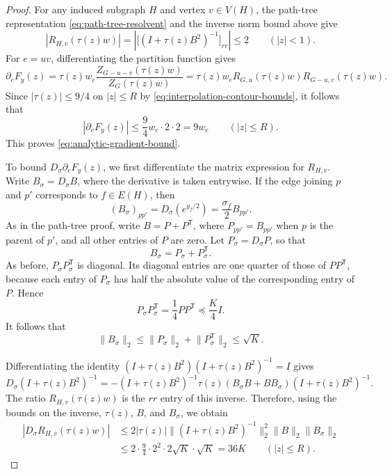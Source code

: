 \documentclass[11pt,reqno,letterpaper]{amsart}
\numberwithin{equation}{section}
\theoremstyle{definition}
\theoremstyle{remark}
\newcommand{\norm}[1]{\lVert #1\rVert}
\begin{document}
\begin{proof}
For any induced subgraph $H$ and vertex $v\in V(H)$, the path-tree
representation \cref{eq:path-tree-resolvent} and the inverse norm bound
above give
\begin{equation*}
 |R_{H,v}(\tau(z)w)|
 =\left|\bigl[(I+\tau(z)B^2)^{-1}\bigr]_{rr}\right|
 \le2
 \qquad(|z|<1).
\end{equation*}
For $e=uv$, differentiating the partition function gives
\[
 \partial_eF_y(z)
 =\tau(z)w_e\frac{Z_{G-u-v}(\tau(z)w)}{Z_G(\tau(z)w)}
 =\tau(z)w_eR_{G,u}(\tau(z)w)R_{G-u,v}(\tau(z)w).
\]
Since $|\tau(z)|\le9/4$ on $|z|\le R$ by
\cref{eq:interpolation-contour-bounds}, it follows that
\[
 |\partial_eF_y(z)|
 \le\frac94w_e\cdot2\cdot2=9w_e
 \qquad(|z|\le R).
\]
This proves \cref{eq:analytic-gradient-bound}.

To bound $D_\sigma\partial_eF_y(z)$, we first differentiate the
matrix expression for $R_{H,v}$. Write $B_\sigma=D_\sigma B$,
where the derivative is taken entrywise. If the edge joining
$p$ and $p'$ corresponds to $f\in E(H)$, then
\[
 (B_\sigma)_{pp'}
 =D_\sigma(e^{y_f/2})
 =\frac{\sigma_f}{2}B_{pp'}.
\]
As in the path-tree proof, write $B=P+P^{\mathsf T}$, where
$P_{pp'}=B_{pp'}$ when $p$ is the parent of $p'$, and all other
entries of $P$ are zero. Let $P_\sigma=D_\sigma P$, so that
\[
 B_\sigma=P_\sigma+P_\sigma^{\mathsf T}.
\]
As before, $P_\sigma P_\sigma^{\mathsf T}$ is diagonal.
Its diagonal entries are one quarter of those of
$PP^{\mathsf T}$, because each entry of $P_\sigma$ has half
the absolute value of the corresponding entry of $P$. Hence
\[
 P_\sigma P_\sigma^{\mathsf T}
 =\frac14PP^{\mathsf T}\preceq\frac K4I.
\]
It follows that
\begin{equation*}
 \norm{B_\sigma}_2
 \le\norm{P_\sigma}_2+\norm{P_\sigma^{\mathsf T}}_2
 \le\sqrt K.
\end{equation*}

Differentiating the identity
$(I+\tau(z)B^2)(I+\tau(z)B^2)^{-1}=I$ gives
\[
 D_\sigma(I+\tau(z)B^2)^{-1}
 =-(I+\tau(z)B^2)^{-1}
   \tau(z)(B_\sigma B+BB_\sigma)
   (I+\tau(z)B^2)^{-1}.
\]
The ratio $R_{H,v}(\tau(z)w)$ is the $rr$ entry of this inverse.
Therefore, using the bounds on the inverse, $\tau(z)$, $B$,
and $B_\sigma$, we obtain
\begin{align*}
 |D_\sigma R_{H,v}(\tau(z)w)|
 &\le
 2|\tau(z)|\norm{(I+\tau(z)B^2)^{-1}}_2^2
   \norm B_2\norm{B_\sigma}_2\\
 &\le2\cdot\frac94\cdot2^2\cdot2\sqrt K\cdot\sqrt K
 =36K
 \qquad(|z|\le R).
\end{align*}


\end{proof}
\end{document}
